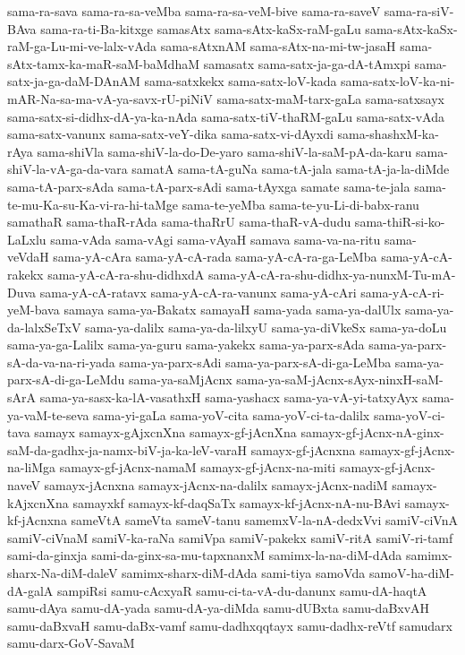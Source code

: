 {sama-ra-sava
sama-ra-sa-veMba
sama-ra-sa-veM-bive
sama-ra-saveV
sama-ra-siV-BAva
sama-ra-ti-Ba-kitxge
samasAtx
sama-sAtx-kaSx-raM-gaLu
sama-sAtx-kaSx-raM-ga-Lu-mi-ve-lalx-vAda
sama-sAtxnAM
sama-sAtx-na-mi-tw-jasaH
sama-sAtx-tamx-ka-maR-saM-baMdhaM
samasatx
sama-satx-ja-ga-dA-tAmxpi
sama-satx-ja-ga-daM-DAnAM
sama-satxkekx
sama-satx-loV-kada
sama-satx-loV-ka-ni-mAR-Na-sa-ma-vA-ya-savx-rU-piNiV
sama-satx-maM-tarx-gaLa
sama-satxsayx
sama-satx-si-didhx-dA-ya-ka-nAda
sama-satx-tiV-thaRM-gaLu
sama-satx-vAda
sama-satx-vanunx
sama-satx-veY-dika
sama-satx-vi-dAyxdi
sama-shashxM-ka-rAya
sama-shiVla
sama-shiV-la-do-De-yaro
sama-shiV-la-saM-pA-da-karu
sama-shiV-la-vA-ga-da-vara
samatA
sama-tA-guNa
sama-tA-jala
sama-tA-ja-la-diMde
sama-tA-parx-sAda
sama-tA-parx-sAdi
sama-tAyxga
samate
sama-te-jala
sama-te-mu-Ka-su-Ka-vi-ra-hi-taMge
sama-te-yeMba
sama-te-yu-Li-di-babx-ranu
samathaR
sama-thaR-rAda
sama-thaRrU
sama-thaR-vA-dudu
sama-thiR-si-ko-LaLxlu
sama-vAda
sama-vAgi
sama-vAyaH
samava
sama-va-na-ritu
sama-veVdaH
sama-yA-cAra
sama-yA-cA-rada
sama-yA-cA-ra-ga-LeMba
sama-yA-cA-rakekx
sama-yA-cA-ra-shu-didhxdA
sama-yA-cA-ra-shu-didhx-ya-nunxM-Tu-mA-Duva
sama-yA-cA-ratavx
sama-yA-cA-ra-vanunx
sama-yA-cAri
sama-yA-cA-ri-yeM-bava
samaya
sama-ya-Bakatx
samayaH
sama-yada
sama-ya-dalUlx
sama-ya-da-lalxSeTxV
sama-ya-dalilx
sama-ya-da-lilxyU
sama-ya-diVkeSx
sama-ya-doLu
sama-ya-ga-Lalilx
sama-ya-guru
sama-yakekx
sama-ya-parx-sAda
sama-ya-parx-sA-da-va-na-ri-yada
sama-ya-parx-sAdi
sama-ya-parx-sA-di-ga-LeMba
sama-ya-parx-sA-di-ga-LeMdu
sama-ya-saMjAcnx
sama-ya-saM-jAcnx-sAyx-ninxH-saM-sArA
sama-ya-sasx-ka-lA-vasathxH
sama-yashacx
sama-ya-vA-yi-tatxyAyx
sama-ya-vaM-te-seva
sama-yi-gaLa
sama-yoV-cita
sama-yoV-ci-ta-dalilx
sama-yoV-ci-tava
samayx
samayx-gAjxcnXna
samayx-gf-jAcnXna
samayx-gf-jAcnx-nA-ginx-saM-da-gadhx-ja-namx-biV-ja-ka-leV-varaH
samayx-gf-jAcnxna
samayx-gf-jAcnx-na-liMga
samayx-gf-jAcnx-namaM
samayx-gf-jAcnx-na-miti
samayx-gf-jAcnx-naveV
samayx-jAcnxna
samayx-jAcnx-na-dalilx
samayx-jAcnx-nadiM
samayx-kAjxcnXna
samayxkf
samayx-kf-daqSaTx
samayx-kf-jAcnx-nA-nu-BAvi
samayx-kf-jAcnxna
sameVtA
sameVta
sameV-tanu
samemxV-la-nA-dedxVvi
samiV-ciVnA
samiV-ciVnaM
samiV-ka-raNa
samiVpa
samiV-pakekx
samiV-ritA
samiV-ri-tamf
sami-da-ginxja
sami-da-ginx-sa-mu-tapxnanxM
samimx-la-na-diM-dAda
samimx-sharx-Na-diM-daleV
samimx-sharx-diM-dAda
sami-tiya
samoVda
samoV-ha-diM-dA-galA
sampiRsi
samu-cAcxyaR
samu-ci-ta-vA-du-danunx
samu-dA-haqtA
samu-dAya
samu-dA-yada
samu-dA-ya-diMda
samu-dUBxta
samu-daBxvAH
samu-daBxvaH
samu-daBx-vamf
samu-dadhxqqtayx
samu-dadhx-reVtf
samudarx
samu-darx-GoV-SavaM
}

